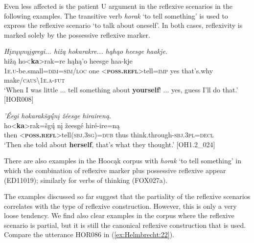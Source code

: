 \documentclass[output=paper]{langscibook}
\begin{document}
Even less affected is the patient U argument in the reflexive scenarios in the following examples. The transitive verb \textit{horak} `to tell something' is used to express the reflexive scenario `to talk about oneself'. In both cases, reflexivity is marked solely by the possessive reflexive marker.

\ea \textit{Hįxųųnųįgregi...  hižą hokarakre... hąhąo heesge haakje.} \\
	  {hižą}   {ho<\textbf{ka}>rak=re}   {hąhą'o} {heesge} {haa-kje}\\ 
  {\textsc{1e.u}-be.small=\textsc{dim}=\textsc{sim/loc}} {one}   {<\textbf{\textsc{poss.refl}}>tell=\textsc{imp}} 	{yes}   {that's.why}  {make/\textsc{caus}{\textbackslash}\textsc{1e.a}-\textsc{fut}}\\
 \glt `When I was little ... tell something about \textbf{yourself}! ... yes, guess I'll do that.' [HOR008]
\z 


\ea \textit{'Éegi hokarakšg\'{ų́}nį žéesge hiraireną}.\\
    {ho<\textbf{ka}>rak=šgų́ nį}
   {žeesgé}  {hiré-ire=ną}\\
  {then}  {<\textbf{\textsc{poss.\textsc{refl}}}>tell(\textsc{sbj.3sg})=\textsc{dub}} {thus}   {think.through-\textsc{sbj.3\textsc{pl}=decl}}\\
  \glt `Then she told about \textbf{herself}, that's what they thought.' [OH1.2\_024]
\z 

There are also examples in the Hoocąk corpus with \textit{horak} `to tell something' in which the combination of reflexive marker plus possessive reflexive appear (ED11019); similarly for verbs of thinking (FOX027a).

The examples discussed so far suggest that the partiality of the reflexive scenarios correlates with the type of reflexive construction. However, this is only a very loose tendency. We find also clear examples in the corpus where the reflexive scenario is partial, but it is still the canonical reflexive construction that is used. Compare the utterance HOR086 in (\ref{ex:Helmbrecht:22}). 
\end{document}
